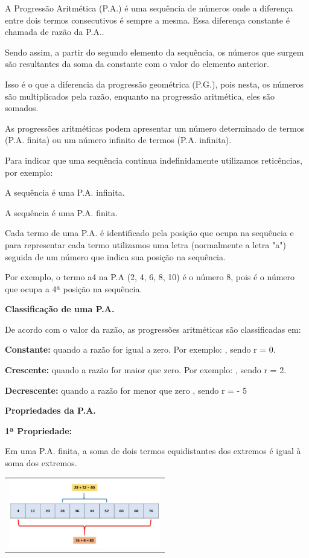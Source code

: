 \begin{multicols*}{2}
	A Progressão Aritmética (P.A.) é uma sequência de números onde a diferença entre dois termos consecutivos é sempre a mesma. Essa diferença constante é chamada de razão da P.A..
	
	Sendo assim, a partir do segundo elemento da sequência, os números que surgem são resultantes da soma da constante com o valor do elemento anterior.
	
	Isso é o que a diferencia da progressão geométrica (P.G.), pois nesta, os números são multiplicados pela razão, enquanto na progressão aritmética, eles são somados.
	
	As progressões aritméticas podem apresentar um número determinado de termos (P.A. finita) ou um número infinito de termos (P.A. infinita).
	
	Para indicar que uma sequência continua indefinidamente utilizamos reticências, por exemplo:
	
	A sequência  é uma P.A. infinita.
	
	A sequência  é uma P.A. finita.
	
	Cada termo de uma P.A. é identificado pela posição que ocupa na sequência e para representar cada termo utilizamos uma letra (normalmente a letra "a") seguida de um número que indica sua posição na sequência.
	
	Por exemplo, o termo a4 na P.A (2, 4, 6, 8, 10) é o número 8, pois é o número que ocupa a 4ª posição na sequência.
	
	\textbf{Classificação de uma P.A.}
	
	De acordo com o valor da razão, as progressões aritméticas são classificadas em:
	
	\textbf{Constante:} quando a razão for igual a zero. Por exemplo: , sendo r = 0.
	
	\textbf{Crescente:} quando a razão for maior que zero. Por exemplo: , sendo r = 2.
	
	\textbf{Decrescente:} quando a razão for menor que zero , sendo r = - 5
	
	\textbf{Propriedades da P.A.}

	\textbf{1ª Propriedade:}
	
	Em uma P.A. finita, a soma de dois termos equidistantes dos extremos é igual à soma dos extremos.
	
        	\begin{tabular}{@{}c@{}}
      		\includegraphics[height=30mm]{assets/papropriedade1.jpg}
    		\end{tabular}
    		

\end{multicols*}
